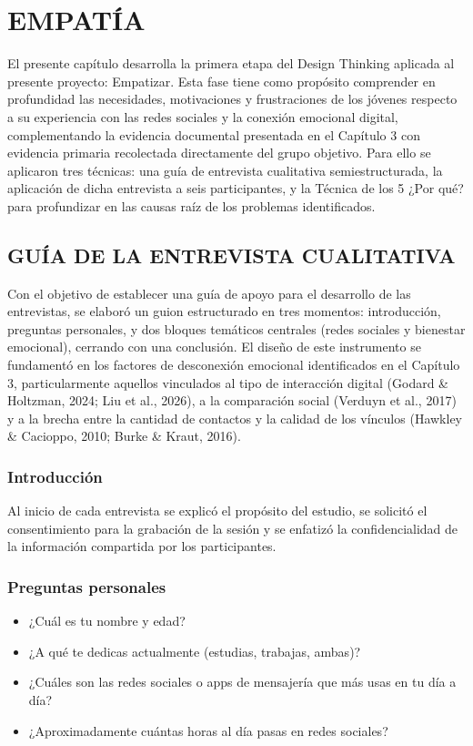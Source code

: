 \chapter{EMPATÍA}
El presente capítulo desarrolla la primera etapa del Design Thinking aplicada al presente proyecto: Empatizar. Esta fase tiene como propósito comprender en profundidad las necesidades, motivaciones y frustraciones de los jóvenes respecto a su experiencia con las redes sociales y la conexión emocional digital, complementando la evidencia documental presentada en el Capítulo 3 con evidencia primaria recolectada directamente del grupo objetivo. Para ello se aplicaron tres técnicas: una guía de entrevista cualitativa semiestructurada, la aplicación de dicha entrevista a seis participantes, y la Técnica de los 5 ¿Por qué? para profundizar en las causas raíz de los problemas identificados.

\section{GUÍA DE LA ENTREVISTA CUALITATIVA}
Con el objetivo de establecer una guía de apoyo para el desarrollo de las entrevistas, se elaboró un guion estructurado en tres momentos: introducción, preguntas personales, y dos bloques temáticos centrales (redes sociales y bienestar emocional), cerrando con una conclusión. El diseño de este instrumento se fundamentó en los factores de desconexión emocional identificados en el Capítulo 3, particularmente aquellos vinculados al tipo de interacción digital (Godard \& Holtzman, 2024; Liu et al., 2026), a la comparación social (Verduyn et al., 2017) y a la brecha entre la cantidad de contactos y la calidad de los vínculos (Hawkley \& Cacioppo, 2010; Burke \& Kraut, 2016).

\subsection{Introducción}
Al inicio de cada entrevista se explicó el propósito del estudio, se solicitó el consentimiento para la grabación de la sesión y se enfatizó la confidencialidad de la información compartida por los participantes.

\subsection{Preguntas personales}
\begin{itemize}
    \item ¿Cuál es tu nombre y edad?
    \item ¿A qué te dedicas actualmente (estudias, trabajas, ambas)?
    \item ¿Cuáles son las redes sociales o apps de mensajería que más usas en tu día a día?
    \item ¿Aproximadamente cuántas horas al día pasas en redes sociales?
\end{itemize}

